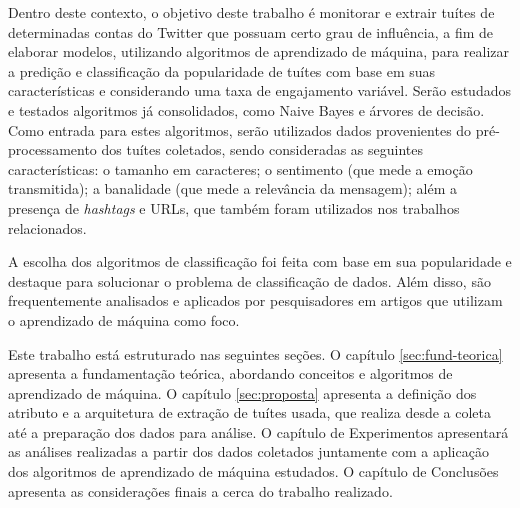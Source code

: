 \documentclass[oneside,openright,12pt]{ufsm_2015} %
\begin{document}
{    \par Dentro deste contexto, o objetivo deste trabalho é monitorar e extrair tuítes de determinadas contas do Twitter que possuam certo grau de influência, a fim de elaborar modelos, utilizando algoritmos de aprendizado de máquina, para realizar a predição e classificação da popularidade de tuítes com base em suas características e considerando uma taxa de engajamento variável. Serão estudados e testados algoritmos já consolidados, como Naive Bayes e árvores de decisão. Como entrada para estes algoritmos, serão utilizados dados provenientes do pré-processamento dos tuítes coletados, sendo consideradas as seguintes características: o tamanho em caracteres; o sentimento (que mede a emoção transmitida); a banalidade (que mede a relevância da mensagem); além a presença de \textit{hashtags} e URLs, que também foram utilizados nos trabalhos relacionados.
    
    \par A escolha dos algoritmos de classificação foi feita com base em sua popularidade e destaque para solucionar o problema de classificação de dados. Além disso, são frequentemente analisados e aplicados por pesquisadores em artigos que utilizam o aprendizado de máquina como foco.

    \par Este trabalho está estruturado nas seguintes seções. O capítulo \ref{sec:fund-teorica} apresenta a fundamentação teórica, abordando conceitos e algoritmos de aprendizado de máquina. O capítulo \ref{sec:proposta} apresenta a definição dos atributo e a arquitetura de extração de tuítes usada, que realiza desde a coleta até a preparação dos dados para análise. O capítulo de Experimentos apresentará as análises realizadas a partir dos dados coletados juntamente com a aplicação dos algoritmos de aprendizado de máquina estudados. O capítulo de Conclusões apresenta as considerações finais a cerca do trabalho realizado.


}
\geraintro  %

\end{document}
